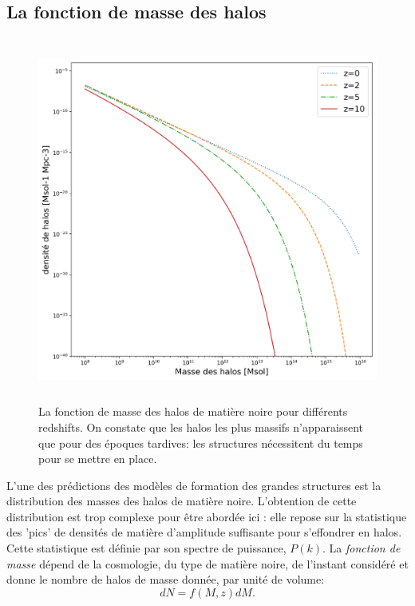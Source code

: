 \subsection{La fonction de masse des halos}
\begin{figure}[htbp]
	\centering
		\includegraphics[height=12cm]{figs/hmf.png}
	\caption[La fonction de masse des halos de matière noire pour différents redshifts]{La fonction de masse des halos de matière noire pour différents redshifts. On constate que les halos les plus massifs n'apparaissent que pour des époques tardives: les structures nécessitent du temps pour se mettre en place.} 
	\label{f:hmf}
\end{figure}
L'une des prédictions des modèles de formation des grandes structures est la distribution des masses des halos de matière noire. L'obtention de cette distribution est trop complexe pour être abordée ici : elle repose sur la statistique des 'pics' de densités de matière d'amplitude suffisante pour s'effondrer en halos. Cette statistique est définie par son spectre de puissance, $P(k)$. La \textit{fonction de masse} dépend de la cosmologie, du type de matière noire, de l'instant considéré et donne le nombre de halos de masse donnée, par unité de volume:
\begin{equation}
dN=f(M,z)dM.
\end{equation}

